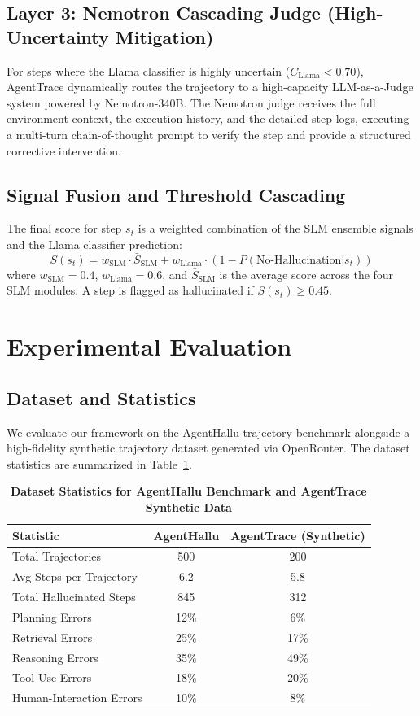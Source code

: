\documentclass[11pt,a4paper]{article}
\begin{document}
\subsection{Layer 3: Nemotron Cascading Judge (High-Uncertainty Mitigation)}
For steps where the Llama classifier is highly uncertain ($C_{\text{Llama}} < 0.70$), AgentTrace dynamically routes the trajectory to a high-capacity LLM-as-a-Judge system powered by Nemotron-340B. The Nemotron judge receives the full environment context, the execution history, and the detailed step logs, executing a multi-turn chain-of-thought prompt to verify the step and provide a structured corrective intervention.

\subsection{Signal Fusion and Threshold Cascading}
The final score for step $s_t$ is a weighted combination of the SLM ensemble signals and the Llama classifier prediction:
\begin{equation}
    S(s_t) = w_{\text{SLM}} \cdot \bar{S}_{\text{SLM}} + w_{\text{Llama}} \cdot (1 - P(\text{No-Hallucination} | s_t))
\end{equation}
where $w_{\text{SLM}} = 0.4$, $w_{\text{Llama}} = 0.6$, and $\bar{S}_{\text{SLM}}$ is the average score across the four SLM modules. A step is flagged as hallucinated if $S(s_t) \ge 0.45$.

\section{Experimental Evaluation}

\subsection{Dataset and Statistics}
We evaluate our framework on the AgentHallu trajectory benchmark alongside a high-fidelity synthetic trajectory dataset generated via OpenRouter. The dataset statistics are summarized in Table~\ref{tab:dataset_stats}.

\begin{table}[ht]
\centering
\caption{\textbf{Dataset Statistics for AgentHallu Benchmark and AgentTrace Synthetic Data}}
\label{tab:dataset_stats}
\begin{tabular}{lcc}
\toprule
\textbf{Statistic} & \textbf{AgentHallu} & \textbf{AgentTrace (Synthetic)} \\
\midrule
Total Trajectories & 500 & 200 \\
Avg Steps per Trajectory & 6.2 & 5.8 \\
Total Hallucinated Steps & 845 & 312 \\
\midrule
Planning Errors & 12\% & 6\% \\
Retrieval Errors & 25\% & 17\% \\
Reasoning Errors & 35\% & 49\% \\
Tool-Use Errors & 18\% & 20\% \\
Human-Interaction Errors & 10\% & 8\% \\
\bottomrule
\end{tabular}
\end{table}
\end{document}
